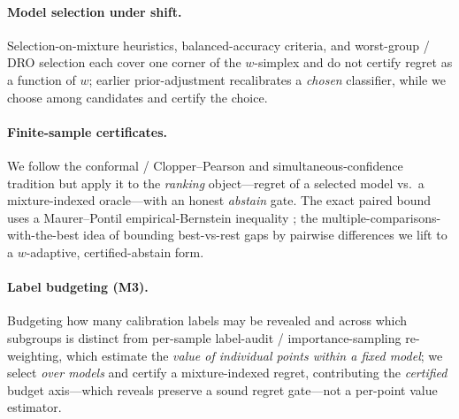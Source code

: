 \documentclass{article}
\begin{document}
\paragraph{Model selection under shift.} Selection-on-mixture heuristics, balanced-accuracy
criteria, and worst-group / DRO selection \citep{sagawa2019distribution, duchi2019sparse}
each cover one corner of the $w$-simplex and do not certify regret as a function of $w$;
earlier prior-adjustment \citep{saerens2002adjusting} recalibrates a \emph{chosen}
classifier, while we choose among candidates and certify the choice.

\paragraph{Finite-sample certificates.} We follow the conformal / Clopper--Pearson
\citep{vovk2005conformal, clopper1934inverse} and simultaneous-confidence tradition but apply
it to the \emph{ranking} object---regret of a selected model vs.\ a mixture-indexed
oracle---with an honest \emph{abstain} gate. The exact paired bound uses a Maurer--Pontil
empirical-Bernstein inequality \citep{maurer2009bernstein}; the
multiple-comparisons-with-the-best idea of bounding best-vs-rest gaps by pairwise
differences \citep{dunnett1955multiple, hsu1984simultaneous} we lift to a $w$-adaptive,
certified-abstain form.

\paragraph{Label budgeting (M3).} Budgeting how many calibration labels may be revealed and
across which subgroups is distinct from per-sample label-audit / importance-sampling
re-weighting, which estimate the \emph{value of individual points within a fixed model}; we
select \emph{over models} and certify a mixture-indexed regret, contributing the
\emph{certified} budget axis---which reveals preserve a sound regret gate---not a per-point
value estimator.
\end{document}
